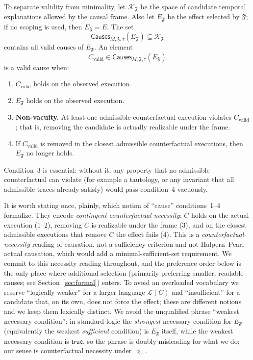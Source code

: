 \documentclass[11pt]{article}
\theoremstyle{remark}
\newcommand{\Lang}{\mathcal{L}}
\newcommand{\True}{\mathsf{true}}
\newcommand{\Frame}{\mathfrak{F}}
\begin{document}
To separate validity from minimality, let \(\mathcal{K}_{\Frame}\) be the space
of candidate temporal explanations allowed by the causal frame. Also let
\(E_{\Frame}\) be the effect selected by \(\Frame\); if no scoping is used,
then \(E_{\Frame}=E\). The set
\[
  \mathsf{Causes}_{M,\Frame,\tau}(E_{\Frame})
  \subseteq \mathcal{K}_{\Frame}
\]
contains all valid causes of \(E_{\Frame}\). An element
\[
  C_{\mathrm{valid}}\in \mathsf{Causes}_{M,\Frame,\tau}(E_{\Frame})
\]
is a valid cause when:
\begin{enumerate}[label=\arabic*.]
  \item \(C_{\mathrm{valid}}\) holds on the observed execution.
  \item \(E_{\Frame}\) holds on the observed execution.
  \item \textbf{Non-vacuity.} At least one admissible counterfactual execution
        violates \(C_{\mathrm{valid}}\); that is, removing the candidate is
        actually realizable under the frame.
  \item If \(C_{\mathrm{valid}}\) is removed in the closest admissible
        counterfactual executions, then \(E_{\Frame}\) no longer holds.
\end{enumerate}
Condition~3 is essential: without it, any property that no admissible
counterfactual can violate (for example a tautology, or any invariant that all
admissible traces already satisfy) would pass condition~4 vacuously.

It is worth stating once, plainly, which notion of ``cause'' conditions~1--4
formalize. They encode \emph{contingent counterfactual necessity}: \(C\) holds
on the actual execution (1--2), removing \(C\) is realizable under the frame
(3), and on the closest admissible executions that remove \(C\) the effect
fails (4). This is a \emph{counterfactual-necessity} reading of causation, not
a sufficiency criterion and not Halpern--Pearl actual causation, which would add
a minimal-sufficient-set requirement. We commit to this necessity reading
throughout, and the preference order below is the only place where additional
selection (primarily preferring smaller, readable causes; see
Section~\ref{sec:formal}) enters. To avoid an overloaded vocabulary we reserve
``logically weaker'' for a larger language \(\Lang(C)\) and ``insufficient'' for
a candidate that, on its own, does not force the effect; these are different
notions and we keep them lexically distinct. We avoid the unqualified phrase
``weakest necessary condition'': in standard logic the \emph{strongest} necessary
condition for \(E_{\Frame}\) (equivalently the weakest \emph{sufficient}
condition) is \(E_{\Frame}\) itself, while the weakest necessary condition is
\(\True\), so the phrase is doubly misleading for what we do; our sense is
counterfactual necessity under \(\preceq_\tau\).
\end{document}
